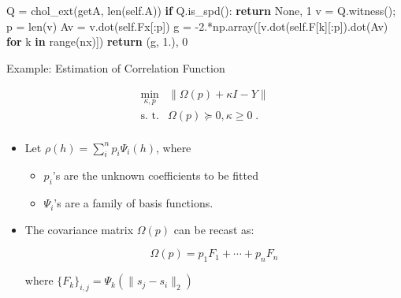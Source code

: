 \documentclass[10pt,ignorenonframetext,serif,onlymath]{beamer}
\newenvironment{Shaded}{}{}
\newcommand{\BuiltInTok}[1]{#1}
\newcommand{\ControlFlowTok}[1]{\textcolor[rgb]{0.00,0.44,0.13}{\textbf{#1}}}
\newcommand{\DecValTok}[1]{\textcolor[rgb]{0.25,0.63,0.44}{#1}}
\newcommand{\FloatTok}[1]{\textcolor[rgb]{0.25,0.63,0.44}{#1}}
\newcommand{\KeywordTok}[1]{\textcolor[rgb]{0.00,0.44,0.13}{\textbf{#1}}}
\newcommand{\NormalTok}[1]{#1}
\newcommand{\OperatorTok}[1]{\textcolor[rgb]{0.40,0.40,0.40}{#1}}
\newcommand{\VariableTok}[1]{\textcolor[rgb]{0.10,0.09,0.49}{#1}}
\providecommand{\tightlist}{%
  \setlength{\itemsep}{0pt}\setlength{\parskip}{0pt}}
\begin{document}
\begin{frame}[fragile]
\begin{Shaded}
\begin{Highlighting}[]
\NormalTok{        Q }\OperatorTok{=}\NormalTok{ chol_ext(getA, }\BuiltInTok{len}\NormalTok{(}\VariableTok{self}\NormalTok{.A))}
        \ControlFlowTok{if}\NormalTok{ Q.is_spd(): }\ControlFlowTok{return} \VariableTok{None}\NormalTok{, }\DecValTok{1}
\NormalTok{        v }\OperatorTok{=}\NormalTok{ Q.witness()}\OperatorTok{;}\NormalTok{ p }\OperatorTok{=} \BuiltInTok{len}\NormalTok{(v)}
\NormalTok{        Av }\OperatorTok{=}\NormalTok{ v.dot(}\VariableTok{self}\NormalTok{.Fx[:p])}
\NormalTok{        g }\OperatorTok{=} \FloatTok{-2.}\OperatorTok{*}\NormalTok{np.array([v.dot(}\VariableTok{self}\NormalTok{.F[k][:p]).dot(Av)}
                          \ControlFlowTok{for}\NormalTok{ k }\KeywordTok{in} \BuiltInTok{range}\NormalTok{(nx)])}
        \ControlFlowTok{return}\NormalTok{ (g, }\FloatTok{1.}\NormalTok{), }\DecValTok{0}
\end{Highlighting}
\end{Shaded}

\end{frame}

\begin{frame}{Example: Estimation of Correlation Function}
\protect\hypertarget{sec:example-estimation-of-correlation-function}{}

\[\begin{array}{ll}
   \min_{\kappa, p}   & \| \Omega(p) + \kappa I - Y \| \\
   \text{s. t.} & \Omega(p) \succcurlyeq 0,  \kappa \geq 0 \; .\\
 \end{array}\]

\begin{itemize}
\item
  Let \(\rho(h) = \sum_i^n p_i \Psi_i(h)\), where

  \begin{itemize}
  \tightlist
  \item
    \(p_i\)’s are the unknown coefficients to be fitted
  \item
    \(\Psi_i\)’s are a family of basis functions.
  \end{itemize}
\item
  The covariance matrix \(\Omega(p)\) can be recast as:

  \[\Omega(p) = p_1 F_1 + \cdots + p_n F_n\]

  where \(\{F_k\}_{i,j} =\Psi_k( \| s_j - s_i \|_2)\)
\end{itemize}

\end{frame}
\end{document}
